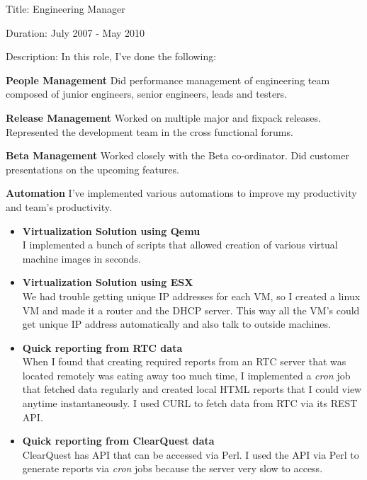 \documentclass [a4paper,11pt] {article}
\begin{document}
\begin{description}
\item{Title:} Engineering Manager
\item{Duration:} July 2007 - May 2010
\item{Description:} In this role, I've done the following:
	    \begin{description}
	    \item{\bf People Management} Did performance management of engineering team composed of junior engineers, senior engineers, leads and testers.
	    \item{\bf Release Management} Worked on multiple major and fixpack releases. Represented the development team in the cross functional forums.
	    \item{\bf Beta Management} Worked closely with the Beta co-ordinator. Did customer presentations on the upcoming features.
	    \item{\bf Automation} I've implemented various automations to improve my productivity and team's productivity.
	    	\begin{itemize}
		\item{\bf Virtualization Solution using Qemu}\\I implemented a bunch of scripts that allowed creation of various virtual machine images in seconds.
		\item{\bf Virtualization Solution using ESX}\\We had trouble
		getting unique IP addresses for each VM, so I created a linux
		VM and made it a router and the DHCP server. This way all the
		VM's could get unique IP address automatically and also talk to
		outside machines. 
		\item{\bf Quick reporting from RTC data}\\
		When I found that creating required reports from an RTC server
		that was located remotely was eating away too much time, I
		implemented a {\it cron} job that fetched data regularly and created
		local HTML reports that I could view anytime instantaneously. I
		used CURL to fetch data from RTC via its REST API.
		\item{\bf Quick reporting from ClearQuest data}\\
			ClearQuest has API that can be accessed via Perl. I
			used the API via Perl to generate reports via {\it cron} jobs
			because the server very slow to access.
		\end{itemize}
	    \end{description}

\end{description}
\end{document}
